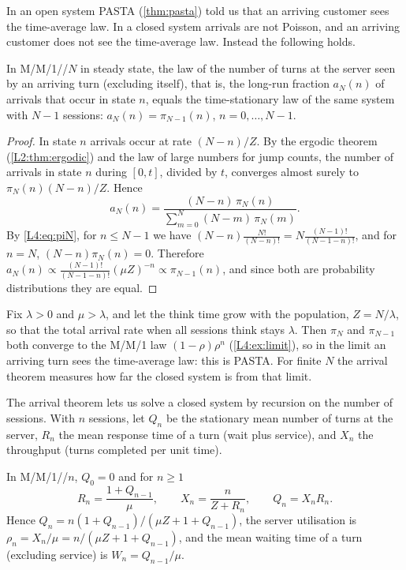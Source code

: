 In an open system PASTA (\cref{thm:pasta}) told us that an arriving customer sees
the time-average law. In a closed system arrivals are not Poisson, and an
arriving customer does not see the time-average law. Instead the following
holds.

\begin{theorem}\label{thm:arrival}
In M/M/1//$N$ in steady state, the law of the number of turns at the server seen
by an arriving turn (excluding itself), that is, the long-run fraction $a_N(n)$
of arrivals that occur in state $n$, equals the time-stationary law of the same
system with $N-1$ sessions: $a_N(n)=\pi_{N-1}(n)$, $n=0,\dots,N-1$.
\end{theorem}

\begin{proof}
In state $n$ arrivals occur at rate $(N-n)/Z$. By the ergodic theorem
(\cref{L2:thm:ergodic}) and the law of large numbers for jump counts, the number of
arrivals in state $n$ during $[0,t]$, divided by $t$, converges almost surely to
$\pi_N(n)(N-n)/Z$. Hence
\[
  a_N(n)=\frac{(N-n)\,\pi_N(n)}{\sum_{m=0}^{N}(N-m)\,\pi_N(m)} .
\]
By \eqref{L4:eq:piN}, for $n\le N-1$ we have
$(N-n)\frac{N!}{(N-n)!}=N\frac{(N-1)!}{(N-1-n)!}$, and for $n=N$,
$(N-n)\pi_N(n)=0$. Therefore
$a_N(n)\propto\frac{(N-1)!}{(N-1-n)!}(\mu Z)^{-n}\propto\pi_{N-1}(n)$, and since
both are probability distributions they are equal.
\end{proof}

\begin{remark}\label{L4:rem:arrival-limit}
Fix $\lambda>0$ and $\mu>\lambda$, and let the think time grow with the population,
$Z=N/\lambda$, so that the total arrival rate when all sessions think stays $\lambda$.
Then $\pi_N$ and $\pi_{N-1}$ both converge to the M/M/1 law $(1-\rho)\rho^n$
(\cref{L4:ex:limit}), so in the limit an arriving turn sees the time-average law: this
is PASTA. For finite $N$ the arrival theorem measures how far the closed system is from
that limit.
\end{remark}

The arrival theorem lets us solve a closed system by recursion on the number of
sessions. With $n$ sessions, let $Q_n$ be the stationary mean number of turns at
the server, $R_n$ the mean response time of a turn (wait plus service), and $X_n$
the throughput (turns completed per unit time).

\begin{theorem}\label{thm:mva}
In M/M/1//$n$, $Q_0=0$ and for $n\ge1$
\[
  R_n=\frac{1+Q_{n-1}}{\mu},\qquad X_n=\frac{n}{Z+R_n},\qquad Q_n=X_nR_n .
\]
Hence $Q_n=n(1+Q_{n-1})/(\mu Z+1+Q_{n-1})$, the server utilisation is
$\rho_n=X_n/\mu=n/(\mu Z+1+Q_{n-1})$, and the mean waiting time of a turn
(excluding service) is $W_n=Q_{n-1}/\mu$.
\end{theorem}


